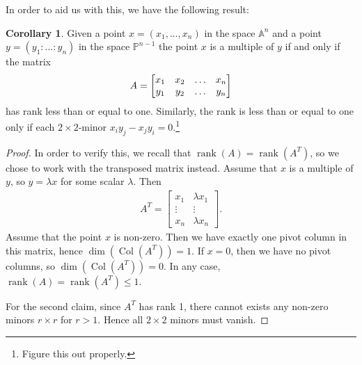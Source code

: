 \documentclass{article}
\theoremstyle{definition}
\newtheorem{corollary}{Corollary}
\newcommand{\A}{\mathbb{A}}
\renewcommand{\P}{\mathbb{P}}
\DeclareMathOperator{\rank}{rank}
\DeclareMathOperator{\col}{Col}
\begin{document}
In order to aid us with this, we have the following result:
\begin{corollary}
    \label{crl:minors}
    Given a point $x = (x_1, \ldots, x_n)$ in the space $\A^n$ and a point $y =
    \left( y_1 : \ldots : y_n \right)$ in the space $\P^{n-1}$ the point
    $x$ is a multiple of $y$ if and only if the matrix
    \begin{equation}
        \notag
        A = 
        \begin{bmatrix}
            x_1 & x_2 & \hdots & x_n \\
            y_1 & y_2 & \hdots & y_n
        \end{bmatrix}
    \end{equation}
    has rank less than or equal to one. Similarly, the rank is less than or
    equal to one only if each $2\times2$-minor $x_iy_j - x_jy_i = 0$.\footnote{Figure this out properly.}
\end{corollary}
\begin{proof}
    In order to verify this, we recall that $\rank(A) = \rank(A^T)$, so we
    chose to work with the transposed matrix instead. Assume that $x$ is a
    multiple of $y$, so $y = \lambda x$ for some scalar $\lambda$.  Then
    \begin{align*}
        A^T = \begin{bmatrix}
            x_1 & \lambda x_1 \\
            \vdots & \vdots \\
            x_n & \lambda x_n
        \end{bmatrix}.
    \end{align*}
    Assume that the point $x$ is non-zero. Then we have exactly one pivot
    column in this matrix, hence $\dim(\col(A^T)) = 1$. If $x = 0$, then we have
    no pivot columns, so $\dim(\col(A^T)) = 0$. In any case, $\rank(A) =
    \rank(A^T) \leq 1$.

    For the second claim, since $A^T$ has rank 1, there cannot exists any
    non-zero minors $r\times r$ for $r > 1$. Hence all $2\times 2$ minors must
    vanish.
\end{proof}
\end{document}
